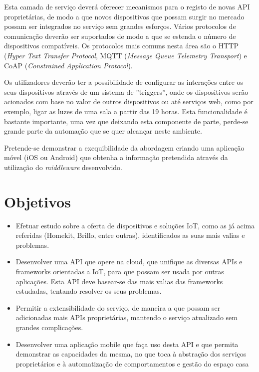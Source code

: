 Esta camada de serviço deverá oferecer mecanismos para o registo de novas API proprietárias, de modo a que novos dispositivos que possam surgir no mercado possam ser integrados no serviço sem grandes esforços. Vários protocolos de comunicação deverão ser suportados de modo a que se estenda o número de dispositivos compatíveis. Os protocolos mais comuns nesta área são o HTTP (\textit{Hyper Text Transfer Protocol}, MQTT (\textit{Message Queue Telemetry Transport}) e CoAP (\textit{Constrained Application Protocol}).

Os utilizadores deverão ter a possibilidade de configurar as interações entre os seus dispositivos através de um sistema de ''triggers'', onde os dispositivos serão acionados com base no valor de outros dispositivos ou até serviços web, como por exemplo, ligar as luzes de uma sala a partir das 19 horas. Esta funcionalidade é bastante importante, uma vez que deixando esta componente de parte, perde-se grande parte da automação que se quer alcançar neste ambiente.

Pretende-se demonstrar a exequibilidade da abordagem criando uma aplicação móvel (iOS ou Android) que obtenha a informação pretendida através da utilização do \textit{middleware} desenvolvido.

\newpage

\section{Objetivos}

\begin{itemize}
\item Efetuar estudo sobre a oferta de dispositivos e soluções IoT, como as já acima referidas (Homekit, Brillo, entre outras), identificados as suas mais valias e problemas.
\item Desenvolver uma API que opere na cloud, que unifique as diversas APIs e frameworks orientadas a IoT, para que possam ser usada por outras aplicações. Esta API deve basear-se das mais valias das frameworks estudadas, tentando resolver os seus problemas.
\item Permitir a extensibilidade do serviço, de maneira a que possam ser adicionadas mais APIs proprietárias, mantendo o serviço atualizado sem grandes complicações.
\item Desenvolver uma aplicação mobile que faça uso desta API e que permita demonstrar as capacidades da mesma, no que toca à abstração dos serviços proprietários e à automatização de comportamentos e gestão do espaço casa
\end{itemize}

